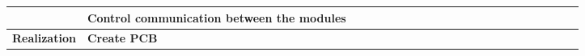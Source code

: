 \begin{table}[ht!]
\begin{tabular}{lp{2.5in}|llllllllllllllllllll|}
    \multicolumn{1}{|l|}{\cellcolor[HTML]{00E2FF}\textbf{}}                & \cellcolor[HTML]{00E2FF}\textbf{Control communication between the modules} & \multicolumn{1}{l|}{}                                   & \multicolumn{1}{l|}{}                                   & \multicolumn{1}{l|}{}                                   & \multicolumn{1}{l|}{}                                   & \multicolumn{1}{l|}{}                                   & \multicolumn{1}{l|}{}                                   & \multicolumn{1}{l|}{}                                   & \multicolumn{1}{l|}{\cellcolor[HTML]{F8A102}}           & \multicolumn{1}{l|}{\cellcolor[HTML]{F8A102}}           & \multicolumn{1}{l|}{\cellcolor[HTML]{F8A102}}            & \multicolumn{1}{l|}{}                                    & \multicolumn{1}{l|}{}                                    & \multicolumn{1}{l|}{}                                    & \multicolumn{1}{l|}{}                                    & \multicolumn{1}{l|}{}                                    & \multicolumn{1}{l|}{}                                    & \multicolumn{1}{l|}{}                                    & \multicolumn{1}{l|}{}                                    & \multicolumn{1}{l|}{}                                    &             \\ \hline
    \multicolumn{1}{|l|}{\cellcolor[HTML]{00E2FF}\textbf{Realization}}     & \cellcolor[HTML]{00E2FF}\textbf{Create PCB}                                & \multicolumn{1}{l|}{}                                   & \multicolumn{1}{l|}{}                                   & \multicolumn{1}{l|}{}                                   & \multicolumn{1}{l|}{}                                   & \multicolumn{1}{l|}{}                                   & \multicolumn{1}{l|}{}                                   & \multicolumn{1}{l|}{}                                   & \multicolumn{1}{l|}{}                                   & \multicolumn{1}{l|}{\cellcolor[HTML]{F8A102}}           & \multicolumn{1}{l|}{}                                    & \multicolumn{1}{l|}{}                                    & \multicolumn{1}{l|}{\cellcolor[HTML]{F8A102}}            & \multicolumn{1}{l|}{\cellcolor[HTML]{F8A102}}            & \multicolumn{1}{l|}{}                                    & \multicolumn{1}{l|}{}                                    & \multicolumn{1}{l|}{\cellcolor[HTML]{F8A102}}            & \multicolumn{1}{l|}{}                                    & \multicolumn{1}{l|}{}                                    & \multicolumn{1}{l|}{}                                    &             \\ \hline

\end{tabular}
\end{table}
